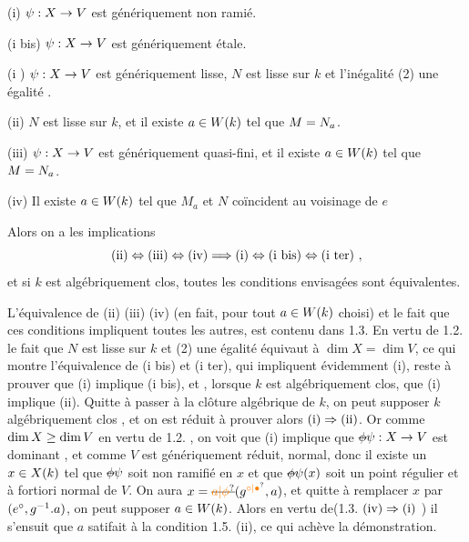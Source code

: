 (i)  $\psi:X\to V$ est génériquement non ramié.

(i bis) $\psi:X\to V$ est génériquement étale.

(i ) $\psi:X\to V$ est génériquement lisse, $N$ est lisse sur $k$ et l'inégalité (2) une égalité .

(ii)  $N$ est lisse sur $k$, et il existe $a\in W(k)$ tel que $M=N_a$.

(iii) $\psi:X\to V$ est génériquement quasi-fini, et il existe $a\in W(k)$ tel que $M=N_a$.

(iv) Il existe $a\in W(k)$ tel que $M_a$ et $N$ coïncident au voisinage de $e$

Alors on a les implications
\[
\text{(ii)}\Leftrightarrow\text{(iii)}\Leftrightarrow\text{(iv)}
\Longrightarrow\text{(i)}\Leftrightarrow\text{(i bis)}\Leftrightarrow\text{(i ter)}\ ,
\]
et si $k$ est algébriquement clos, toutes les conditions envisagées sont
équivalentes.

L'équivalence de (ii) (iii) (iv) (en fait, pour tout $a\in W(k)$ choisi) et le fait que ces conditions impliquent toutes les autres, est contenu dans 1.3. En vertu de 1.2. le fait que $N$ est lisse sur $k$ et (2) une égalité équivaut à $\dim X=\dim V$, ce qui montre l'équivalence de (i bis) et (i ter), qui impliquent évidemment (i), reste à prouver que (i) implique (i bis), et , lorsque $k$ est algébriquement clos, que (i) implique (ii). Quitte à passer à la clôture algébrique de $k$, on peut supposer $k$ algébriquement clos , et on est réduit à prouver alors $\text{(i)}\Rightarrow\text{(ii)}$. Or comme $\dim X\geq\dim V$ en vertu de 1.2. , on voit que (i) implique que $\deleted{\phi}\handwritten{\psi}:X\handwritten{\to}V$ est dominant , et comme $V$ est génériquement réduit,   normal, donc il existe un  $x\in X(k)$ tel que $\deleted{\phi}\handwritten{\psi}$ soit non ramifié en $x$ et que $\deleted{\phi}\handwritten{\psi}(x)$ soit un point  régulier et à fortiori normal de $V$. On aura $x=\deleted{\unsure{a|\phi}}(g^{\handwritten{\unsure{\circ|\bullet}}},a)$, et quitte à remplacer $x$ par $(e^{\circ},g^{-1}.a)$, on peut supposer $a\in W(k)$. Alors en vertu de(1.3. $\text{(iv)}\Rightarrow\text{(i)}$ ) il s'ensuit que $a$ satifait à la condition 1.5. (ii), ce qui achève la démonstration.

